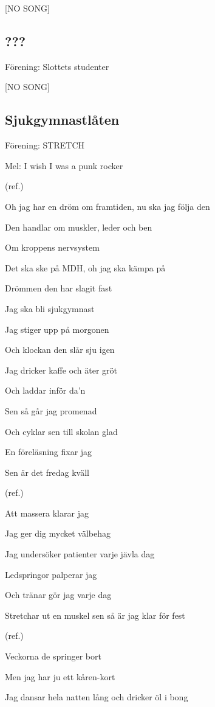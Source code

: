 [NO SONG]

\subsection{\textbf{???}}

Förening: Slottets studenter

[NO SONG]

\subsection{\textbf{Sjukgymnastlåten}}

Förening: STRETCH

Mel:  I wish I was a punk rocker

(ref.)

Oh jag har en dröm om framtiden, nu ska jag följa den

Den handlar om muskler, leder och ben

Om kroppens nervsystem

Det ska ske på MDH, oh jag ska kämpa på

Drömmen den har slagit fast

Jag ska bli sjukgymnast\bigskip


Jag stiger upp på morgonen

Och klockan den slår sju igen

Jag dricker kaffe och äter gröt

Och laddar inför da’n

Sen så går jag promenad

Och cyklar sen till skolan glad

En föreläsning fixar jag

Sen är det fredag kväll\bigskip

(ref.)\bigskip

Att massera klarar jag

Jag ger dig mycket välbehag

Jag undersöker patienter varje jävla dag

Ledspringor palperar jag

Och tränar gör jag varje dag

Stretchar ut en muskel sen så är jag klar för fest\bigskip

(ref.)\bigskip

Veckorna de springer bort

Men jag har ju ett kåren-kort

Jag dansar hela natten lång och dricker öl i bong

